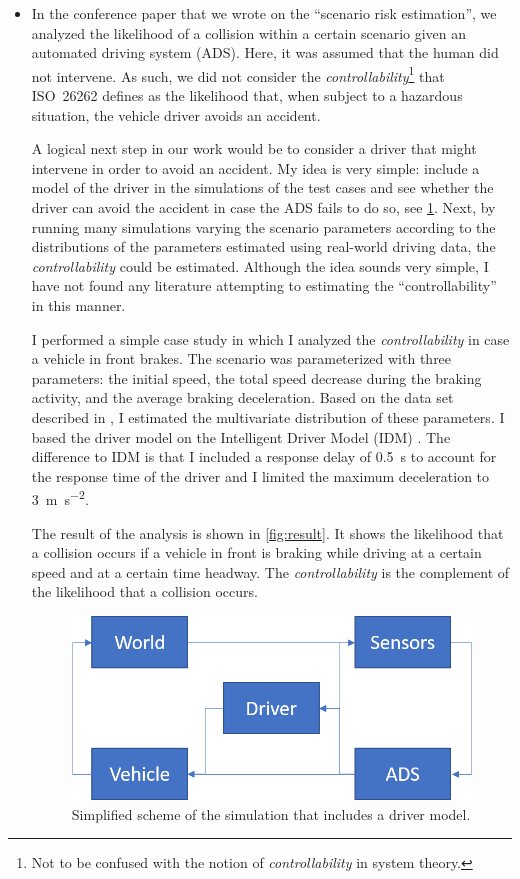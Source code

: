 \documentclass[10pt,final,a4paper,oneside,onecolumn]{article}
\begin{document}
\begin{itemize}
	\item In the conference paper that we wrote on the ``scenario risk estimation'', we analyzed the likelihood of a collision within a certain scenario given an automated driving system (ADS). Here, it was assumed that the human did not intervene. As such, we did not consider the \emph{controllability}\footnote{Not to be confused with the notion of \emph{controllability} in system theory.} that ISO~26262 defines as the likelihood that,
	when subject to a hazardous situation, the vehicle driver avoids
	an accident. 
	
	A logical next step in our work would be to consider a driver that might intervene in order to avoid an accident. My idea is very simple: include a model of the driver in the simulations of the test cases and see whether the driver can avoid the accident in case the ADS fails to do so, see \cref{fig:model}. Next, by running many simulations varying the scenario parameters according to the distributions of the parameters estimated using real-world driving data, the \emph{controllability} could be estimated. Although the idea sounds very simple, I have not found any literature attempting to estimating the ``controllability'' in this manner. 
	
	I performed a simple case study in which I analyzed the \emph{controllability} in case a vehicle in front brakes. The scenario was parameterized with three parameters: the initial speed, the total speed decrease during the braking activity, and the average braking deceleration. Based on the data set described in \autocite{paardekooper2019dataset6000km}, I estimated the multivariate distribution of these parameters. I based the driver model on the Intelligent Driver Model (IDM) \autocite{treiber2000congested}. The difference to IDM is that I included a response delay of \SI{0.5}{\second} to account for the response time of the driver and I limited the maximum deceleration to \SI{3}{\meter\per\second\squared}.
	
	The result of the analysis is shown in \cref{fig:result}. It shows the likelihood that a collision occurs if a vehicle in front is braking while driving at a certain speed and at a certain time headway. The \emph{controllability} is the complement of the likelihood that a collision occurs.
	
	\begin{figure}
		\centering
		\includegraphics[width=.5\linewidth]{model.png}
		\caption{Simplified scheme of the simulation that includes a driver model.}
		\label{fig:model}
	\end{figure}
	

\end{itemize}
\end{document}
